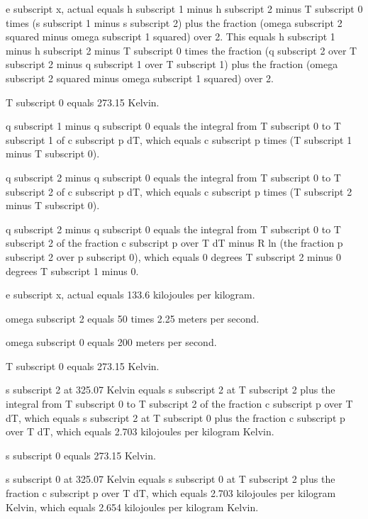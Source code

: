 e subscript x, actual equals h subscript 1 minus h subscript 2 minus T subscript 0 times (s subscript 1 minus s subscript 2) plus the fraction (omega subscript 2 squared minus omega subscript 1 squared) over 2. This equals h subscript 1 minus h subscript 2 minus T subscript 0 times the fraction (q subscript 2 over T subscript 2 minus q subscript 1 over T subscript 1) plus the fraction (omega subscript 2 squared minus omega subscript 1 squared) over 2.

T subscript 0 equals 273.15 Kelvin.

q subscript 1 minus q subscript 0 equals the integral from T subscript 0 to T subscript 1 of c subscript p dT, which equals c subscript p times (T subscript 1 minus T subscript 0).

q subscript 2 minus q subscript 0 equals the integral from T subscript 0 to T subscript 2 of c subscript p dT, which equals c subscript p times (T subscript 2 minus T subscript 0).

q subscript 2 minus q subscript 0 equals the integral from T subscript 0 to T subscript 2 of the fraction c subscript p over T dT minus R ln (the fraction p subscript 2 over p subscript 0), which equals 0 degrees T subscript 2 minus 0 degrees T subscript 1 minus 0.

e subscript x, actual equals 133.6 kilojoules per kilogram.

omega subscript 2 equals 50 times 2.25 meters per second.

omega subscript 0 equals 200 meters per second.

T subscript 0 equals 273.15 Kelvin.

s subscript 2 at 325.07 Kelvin equals s subscript 2 at T subscript 2 plus the integral from T subscript 0 to T subscript 2 of the fraction c subscript p over T dT, which equals s subscript 2 at T subscript 0 plus the fraction c subscript p over T dT, which equals 2.703 kilojoules per kilogram Kelvin.

s subscript 0 equals 273.15 Kelvin.

s subscript 0 at 325.07 Kelvin equals s subscript 0 at T subscript 2 plus the fraction c subscript p over T dT, which equals 2.703 kilojoules per kilogram Kelvin, which equals 2.654 kilojoules per kilogram Kelvin.